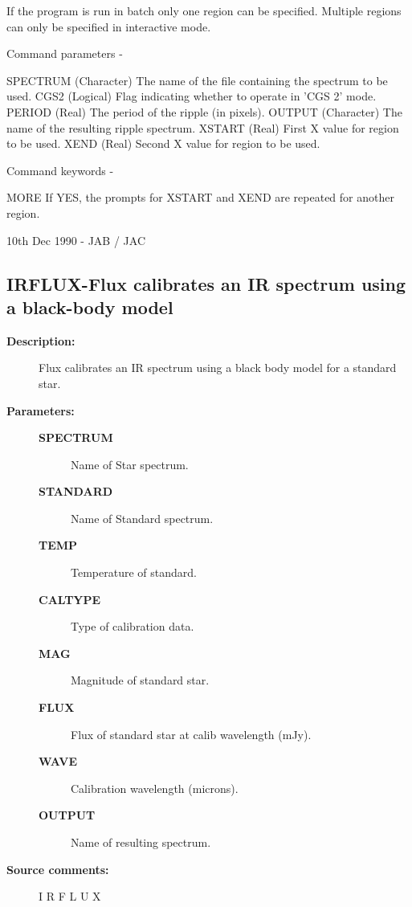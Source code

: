 \begin{description}
\begin{description}
\begin{terminalv}
 If the program is run in batch only one region can be specified.
 Multiple regions can only be specified in interactive mode.

 Command parameters -

 SPECTRUM    (Character) The name of the file containing the
             spectrum to be used.
 CGS2        (Logical) Flag indicating whether to operate in 'CGS 2'
             mode.
 PERIOD      (Real) The period of the ripple (in pixels).
 OUTPUT      (Character) The name of the resulting ripple spectrum.
 XSTART      (Real) First X value for region to be used.
 XEND        (Real) Second X value for region to be used.

 Command keywords -

 MORE        If YES, the prompts for XSTART and XEND are repeated for
             another region.

 10th Dec 1990 - JAB / JAC
\end{terminalv}
\end{description}
\subsection{IRFLUX-\label{IRFLUX}Flux calibrates an IR spectrum using a black-body model}
\begin{description}

\item [\textbf{Description:}]
 Flux calibrates an IR spectrum using a black body model for a
 standard star.

\item [\textbf{Parameters:}]
\begin{description}
\item [\textbf{SPECTRUM}]
 Name of Star spectrum.
\item [\textbf{STANDARD}]
 Name of Standard spectrum.
\item [\textbf{TEMP}]
 Temperature of standard.
\item [\textbf{CALTYPE}]
 Type of calibration data.
\item [\textbf{MAG}]
 Magnitude of standard star.
\item [\textbf{FLUX}]
 Flux of standard star at calib wavelength (mJy).
\item [\textbf{WAVE}]
 Calibration wavelength (microns).
\item [\textbf{OUTPUT}]
 Name of resulting spectrum.
\end{description}

\item [\textbf{Source comments:}]
\begin{terminalv}
 I R F L U X


\end{terminalv}
\end{description}
\end{description}

